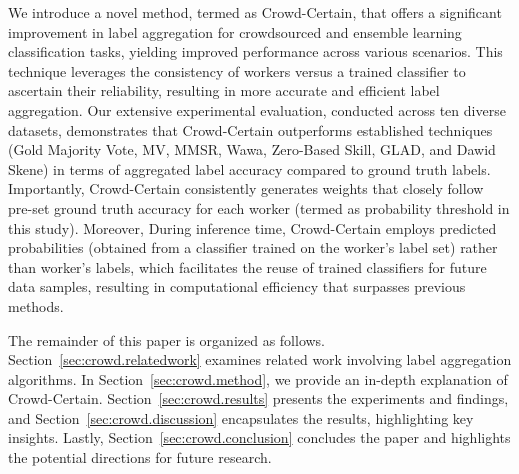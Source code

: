 We introduce a novel method, termed as Crowd-Certain, that offers a significant improvement  in label aggregation for crowdsourced and ensemble learning classification tasks, yielding improved performance across various scenarios. This technique leverages the consistency of workers versus a trained classifier to ascertain their reliability, resulting in more accurate and efficient label aggregation.
Our extensive experimental evaluation, conducted across ten diverse datasets, demonstrates that Crowd-Certain outperforms established techniques (Gold Majority Vote, MV, MMSR, Wawa, Zero-Based Skill, GLAD, and Dawid Skene) in terms of aggregated label accuracy compared to ground truth labels. Importantly, Crowd-Certain consistently generates weights that closely follow pre-set ground truth accuracy for each worker (termed as probability threshold in this study). Moreover, During inference time, Crowd-Certain employs predicted probabilities (obtained from a classifier trained on the worker's label set) rather than worker's labels, which facilitates the reuse of trained classifiers for future data samples, resulting in computational efficiency that surpasses previous methods.

The remainder of this paper is organized as follows. Section~\ref{sec:crowd.relatedwork} examines related work involving label aggregation algorithms. In Section~\ref{sec:crowd.method}, we provide an in-depth explanation of Crowd-Certain. Section~\ref{sec:crowd.results} presents the experiments and findings, and Section~\ref{sec:crowd.discussion} encapsulates the results, highlighting key insights. Lastly, Section~\ref{sec:crowd.conclusion} concludes the paper and highlights the potential directions for future research.
%
